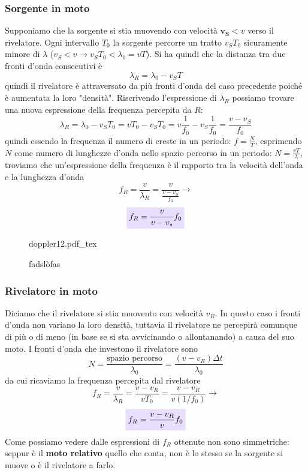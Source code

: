 \documentclass[x11names]{article}
\newcommand{\incfig}[1]{%
	\def\svgwidth{\columnwidth}
	{#1.pdf_tex}
}
\newcommand{\viola}[1]{\colorbox{myred}{$\displaystyle #1$}}
\begin{document}
	\subsubsection{Sorgente in moto}
	Supponiamo che la sorgente si stia muovendo con velocità \(\boldsymbol{v_S} < v\) verso il rivelatore. Ogni intervallo \(T_0\) la sorgente percorre un tratto \(v_ST_0\) sicuramente minore di \(\lambda\) (\(v_S < v \to v_ST_0 < \lambda_0= vT\)). Si ha quindi che la distanza tra due fronti d'onda consecutivi è
	\[ 
	\lambda_R = \lambda_0 - v_ST
	\]
	quindi il rivelatore è attraversato da più fronti d'onda del caso precedente poiché è aumentata la loro "densità". Riscrivendo l'espressione di \(\lambda_R\) possiamo trovare una nuova espressione della frequenza percepita da \(R\): 
	\[ 
	\lambda_R = \lambda_0 - v_ST_0 = vT_0 - v_ST_0 = v\frac{1}{f_0} - v_S\frac{1}{f_0} = \frac{v - v_S}{f_0}
	\]
	quindi essendo la frequenza il numero di creste in un periodo: \(f =\frac{N}{T}\), esprimendo \(N\) come numero di lunghezze d'onda nello spazio percorso in un periodo: \(N = \frac{vT}{\lambda}\), troviamo che un'espressione della frequenza è il rapporto tra la velocità dell'onda e la lunghezza d'onda 
	\[ 
	f_R = \frac{v}{\lambda_R} = \frac{v}{\frac{v - v_S}{f_0}} \to
	\]
	\begin{equation}
		\viola{f_R = \frac{v}{v - v_s}f_0}
	\end{equation}
	
	\begin{figure}[ht]
		\centering
		\incfig{doppler12}
		\caption{fadslòfas}
		\label{fig:fasdkllfas}
	\end{figure}
	
	\subsubsection{Rivelatore in moto}
	Diciamo che il rivelatore si stia muovento con velocità \(v_R\). In questo caso i fronti d'onda non variano la loro densità, tuttavia il rivelatore ne percepirà comunque di più o di meno (in base se si sta avvicinando o allontanando) a causa del suo moto. I fronti d'onda che investono il rivelatore sono
	\[ 
	N = \frac{\text{spazio percorso}}{\lambda_0} = \frac{(v - v_R)\Delta t}{\lambda_0}
	\]
	da cui ricaviamo la frequenza percepita dal rivelatore
	\[ 
	f_R = \frac{v}{\lambda_R} = \frac{v - v_R}{vT_0} = \frac{v - v_R}{v(1/f_0)} \to
	\]
	\begin{equation}
	\viola{f_R = \frac{v - v_R}{v}f_0}
	\end{equation}
	Come possiamo vedere dalle espressioni di \(f_R\) ottenute non sono simmetriche: seppur è il \textbf{moto relativo} quello che conta, non è lo stesso se la sorgente si muove o è il rivelatore a farlo.
	
\end{document}
